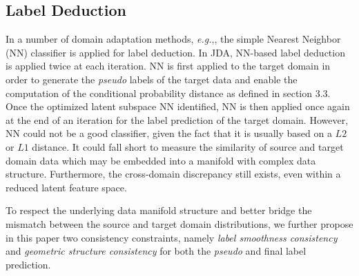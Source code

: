 \documentclass[10pt,twocolumn,letterpaper]{article}
\newcommand\luo[1]{{\footnotesize \color{blue}[#1 - \textbf{Luo}]}}
\begin{document}
\begin{CJK*}{UTF8}{gkai}


\subsection{Label Deduction }
In a number of domain adaptation methods, \textit{e.g.},\cite{pan2008transfer,pan2011domain,long2013transfer,4967588}, the simple Nearest Neighbor (NN) classifier is applied for label deduction. In JDA, NN-based label deduction is applied twice at each iteration. NN is first applied to the target domain in order to generate the \emph{pseudo} labels of the target data and enable the computation of the conditional probability distance as defined in section 3.3. Once the optimized latent subspace NN identified, NN is then applied once again at the end of an iteration for the label prediction of the target domain. However, NN could not be a good classifier, given the fact that it is usually based on a $L2$ or $L1$ distance. It could fall short to measure the similarity of source and target domain data which may be embedded into a manifold with complex data structure. Furthermore, the cross-domain discrepancy still exists, even within a reduced latent feature space. 

To respect the underlying data manifold structure and better bridge the mismatch between the source and target domain distributions, we further propose  in this paper two consistency constraints, namely \textit{label smoothness consistency} and \textit{geometric structure consistency} for both the \emph{pseudo} and final label prediction. 





\end{CJK*}
\end{document}
